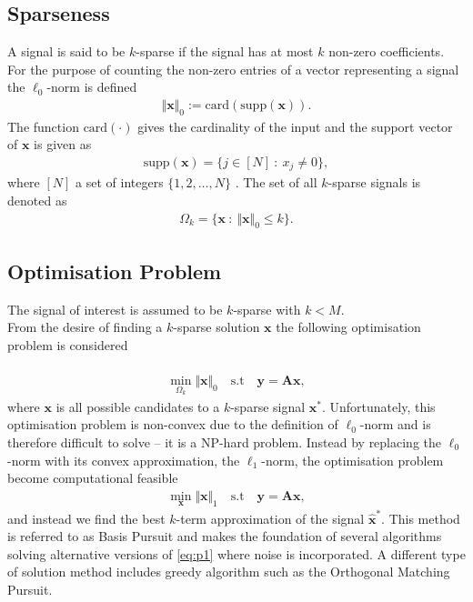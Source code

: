 \subsection{Sparseness} 
A signal is said to be $k$-sparse if the signal has at most $k$ non-zero coefficients. For the purpose of counting the non-zero entries of a vector representing a signal the $\ell_0$-norm is defined
\begin{align*}
\Vert \mathbf{x} \Vert_0 := \text{card}(\text{supp}(\mathbf{x})).
\end{align*}
The function $\text{card}(\cdot)$ gives the cardinality of the input and the support vector of $\mathbf{x}$ is given as
\begin{align*}
\text{supp}(\mathbf{x}) = \{ j \in [N] \ : \ x_j \neq 0 \},
\end{align*} 
where $[N]$ a set of integers $\{1,2,\hdots,N\}$ \cite[p. 41]{FR}. The set of all $k$-sparse signals is denoted as
\begin{align*}
\Omega_k = \{ \mathbf{x} \ : \ \Vert \mathbf{x} \Vert_0 \leq k \}.
\end{align*}

\subsection{Optimisation Problem} 
The signal of interest is assumed to be $k$-sparse with $k < M$. \\
From the desire of finding a $k$-sparse solution $\mathbf{x}$ the following optimisation problem is considered
\\ \\
\begin{align*}
\min_{\Omega_k} \Vert \mathbf{x} \Vert_0 \quad \text{s.t} \quad \mathbf{y} = \mathbf{Ax},
\end{align*}
where $\mathbf{x}$ is all possible candidates to a $k$-sparse signal $\mathbf{x}^\ast$.
Unfortunately, this optimisation problem is non-convex due to the definition of $\ell_0$-norm and is therefore difficult to solve -- it is a NP-hard problem. Instead by replacing the $\ell_0$-norm with its convex approximation, the $\ell_1$-norm, the optimisation problem become computational feasible \cite[p. 27]{CS}
\begin{align}\label{eq:p1}
\min_{\mathbf{x}} \Vert \mathbf{x} \Vert_1 \quad \text{s.t} \quad \mathbf{y} = \mathbf{Ax},
\end{align} 
and instead we find the best $k$-term approximation of the signal $\hat{\mathbf{x}}^\ast$.
This method is referred to as Basis Pursuit and makes the foundation of several algorithms solving alternative versions of \eqref{eq:p1} where noise is incorporated. A different type of solution method includes greedy algorithm such as the Orthogonal Matching Pursuit.    
      
